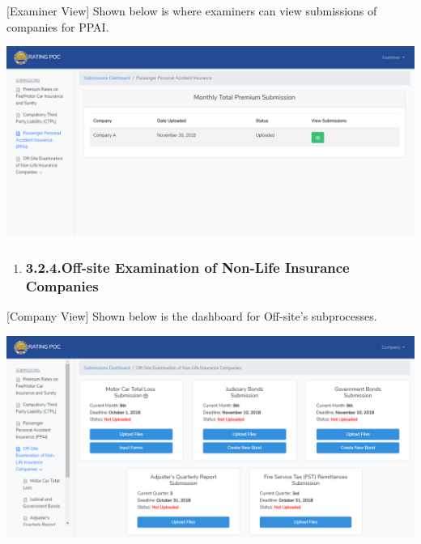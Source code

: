 \documentclass{article}
\begin{document}
[Examiner View] Shown below is where examiners can
view submissions of companies for PPAI.%

\includegraphics[keepaspectratio=true]{up-ic-screens/image183}{}%

\begin{enumerate}[noitemsep,topsep=\mdcompacttopsep]%

\item{}
\subsubsection{3.2.4.\hspace*{0.5em}Off-site Examination of Non-Life Insurance Companies}\label{sec-off-site-examination-of-non-life-insurance-companies}%
\end{enumerate}%

\noindent{}[Company View] Shown below is the dashboard for
Off-site’s subprocesses.%

\includegraphics[keepaspectratio=true]{up-ic-screens/image52}{}%
\end{document}
